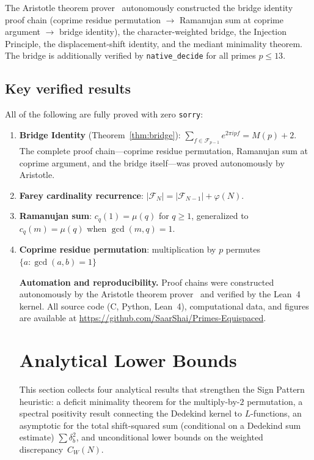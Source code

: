 \documentclass[11pt]{article}
\theoremstyle{definition}
\newcommand{\F}{\mathcal{F}}
\begin{document}
The Aristotle theorem prover~\cite{Aristotle2025}
autonomously constructed the bridge identity proof chain
(coprime residue permutation $\to$ Ramanujan sum at coprime
argument $\to$ bridge identity), the character-weighted
bridge, the Injection Principle, the displacement-shift
identity, and the mediant minimality theorem.
The bridge is additionally verified by
\texttt{native\_decide} for all primes $p \le 13$.

\subsection{Key verified results}

All of the following are fully proved with zero \texttt{sorry}:
\begin{enumerate}
  \item \textbf{Bridge Identity} (Theorem~\ref{thm:bridge}):
    $\sum_{f \in \F_{p-1}} e^{2\pi ipf} = M(p) + 2$.
    The complete proof chain---coprime residue permutation,
    Ramanujan sum at coprime argument, and the bridge
    itself---was proved autonomously by Aristotle.
  \item \textbf{Farey cardinality recurrence}:
    $|\F_N| = |\F_{N-1}| + \varphi(N)$.
  \item \textbf{Ramanujan sum}: $c_q(1) = \mu(q)$ for $q \ge 1$,
    generalized to $c_q(m) = \mu(q)$ when $\gcd(m,q) = 1$.
  \item \textbf{Coprime residue permutation}:
    multiplication by $p$ permutes $\{a : \gcd(a,b) = 1\}$



\smallskip\noindent
\textbf{Automation and reproducibility.}\quad
Proof chains were constructed autonomously by the
Aristotle theorem prover~\cite{Aristotle2025} and verified
by the Lean~4 kernel.
All source code (C, Python, Lean~4), computational data,
and figures are available at
\url{https://github.com/SaarShai/Primes-Equispaced}.

\section{Analytical Lower Bounds}\label{sec:lower-bounds}

This section collects four analytical results that strengthen
the Sign Pattern heuristic: a deficit minimality theorem for the
multiply-by-$2$ permutation, a spectral positivity result
connecting the Dedekind kernel to $L$-functions, an
asymptotic for the total shift-squared sum (conditional on a Dedekind sum estimate)
$\sum\delta_b^2$, and unconditional lower bounds on the
weighted discrepancy~$C_W(N)$.

\end{enumerate}
\end{document}
